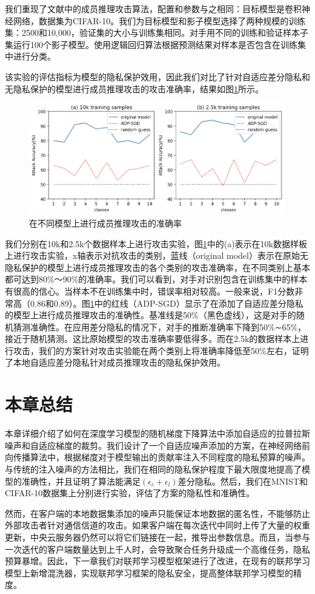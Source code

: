 我们重现了文献中的成员推理攻击算法，配置和参数与之相同：目标模型是卷积神经网络，数据集为CIFAR-10。我们为目标模型和影子模型选择了两种规模的训练集：2500和10,000，验证集的大小与训练集相同。对手用不同的训练和验证样本子集运行100个影子模型。使用逻辑回归算法根据预测结果对样本是否包含在训练集中进行分类。

该实验的评估指标为模型的隐私保护效用，因此我们对比了针对自适应差分隐私和无隐私保护的模型进行成员推理攻击的攻击准确率，结果如图\ref{fig:在不同模型上进行成员推理攻击的准确率}所示。

\begin{figure}[!hbt]
\centering
	\includegraphics[scale=0.3]{fig2/C3/第三章实验三}%
	\caption{在不同模型上进行成员推理攻击的准确率}
	\label{fig:在不同模型上进行成员推理攻击的准确率}	
\end{figure}

我们分别在10k和2.5k个数据样本上进行攻击实验，图\ref{fig:在不同模型上进行成员推理攻击的准确率}中的(a)表示在10k数据样板上进行攻击实验，x轴表示对抗攻击的类别，蓝线（original model）表示在原始无隐私保护的模型上进行成员推理攻击的各个类别的攻击准确率，在不同类别上基本都可达到80\%～90\%的准确率。我们可以看到，对手对识别包含在训练集中的样本有很高的信心。当样本不在训练集中时，错误率相对较高。一般来说，F1分数非常高（0.86和0.89）。图\ref{fig:在不同模型上进行成员推理攻击的准确率}中的红线（ADP-SGD）显示了在添加了自适应差分隐私的模型上进行成员推理攻击的准确性。基准线是50\%（黑色虚线），这是对手的随机猜测准确性。在应用差分隐私的情况下，对手的推断准确率下降到50\%∼65\%，接近于随机猜测。这比原始模型的攻击准确率要低得多。而在2.5k的数据样本上进行攻击，我们的方案针对攻击实验能在两个类别上将准确率降低至50\%左右，证明了本地自适应差分隐私针对成员推理攻击的隐私保护效用。

\section{本章总结}
本章详细介绍了如何在深度学习模型的随机梯度下降算法中添加自适应的拉普拉斯噪声和自适应梯度的裁剪。我们设计了一个自适应噪声添加的方案，在神经网络前向传播算法中，根据梯度对于模型输出的贡献率注入不同程度的隐私预算的噪声。与传统的注入噪声的方法相比，我们在相同的隐私保护程度下最大限度地提高了模型的准确性，并且证明了算法能满足$\left(\epsilon_{c}+\epsilon_{l}\right)$差分隐私。然后，我们在MNIST和CIFAR-10数据集上分别进行实验，评估了方案的隐私性和准确性。

然而，在客户端的本地数据集添加的噪声只能保证本地数据的匿名性，不能够防止外部攻击者针对通信信道的攻击。如果客户端在每次迭代中同时上传了大量的权重更新，中央云服务器仍然可以将它们链接在一起，推导出参数信息。而且，当参与一次迭代的客户端数量达到上千人时，会导致聚合任务升级成一个高维任务，隐私预算暴增。因此，下一章我们对联邦学习模型框架进行了改进，在现有的联邦学习模型上新增混洗器，实现联邦学习框架的隐私安全，提高整体联邦学习模型的精度。



